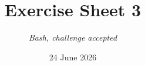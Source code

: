 




\title{{\vspace{-12mm}\huge\textbf{Exercise Sheet 3}}}
\author{\textit{Bash, challenge accepted}}
\date{{\small 24 June 2026}}


    \maketitle
    \bigskip
    
    \bigskip
    
    \bigskip
    
    \bigskip
    
    \bigskip
    
    \bigskip
    
